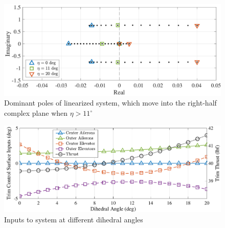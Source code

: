 \documentclass[english]{ifacconf}
\begin{document}
\begin{figure}[htbp]
	\centering
	\includegraphics[width=0.95\columnwidth]{../fig/trim-poles-zoom-2.pdf}
	\caption{Dominant poles of linearized system, which move into the right-half complex plane when $\eta > 11^\circ$}
	\label{fig:trim-poles-zoom}
\end{figure}

\begin{figure}[htbp]
	\centering
	\includegraphics[width=0.95\columnwidth]{../fig/trim-inputs-3.pdf}
	\caption{Inputs to system at different dihedral angles}
	\label{fig:trim-inputs}
\end{figure}
\end{document}
